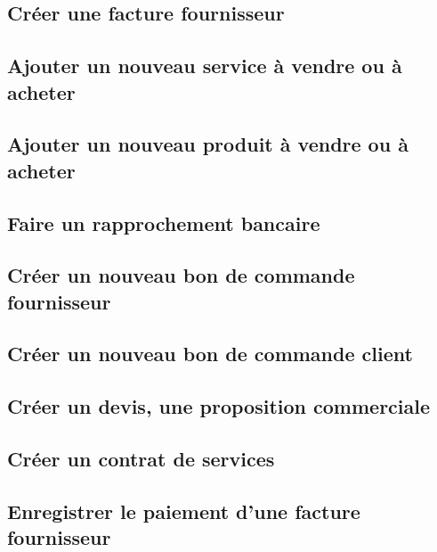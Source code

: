 \documentclass[a4paper]{article}
\begin{document}
\subsection{Créer une facture fournisseur}
\label{sec:DolibarrFactureFournisseur}

\subsection{Ajouter un nouveau service à vendre ou à acheter}
\label{sec:DolibarrNouveauService}

\subsection{Ajouter un nouveau produit à vendre ou à acheter}
\label{sec:DolibarrNouveauProduit}

\subsection{Faire un rapprochement bancaire}
\label{sec:DolibarrBanqueRapprochement}

\subsection{Créer un nouveau bon de commande fournisseur}
\label{sec:DolibarrCommandeFournisseur}

\subsection{Créer un nouveau bon de commande client}
\label{sec:DolibarrCommandeClient}

\subsection{Créer un devis, une proposition commerciale}
\label{sec:DolibarrDevisPropal}

\subsection{Créer un contrat de services}
\label{sec:DolibarrContratServices}

\subsection{Enregistrer le paiement d'une facture fournisseur}
\label{sec:DolibarrPaiementFactureFournisseur}
\end{document}
